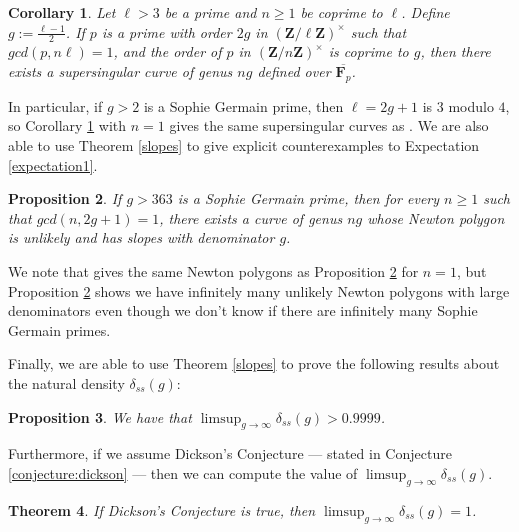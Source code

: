 \documentclass{article}
\newtheorem{theorem}{Theorem}[section]
\newtheorem{corollary}[theorem]{Corollary}
\newtheorem{proposition}[theorem]{Proposition}
\theoremstyle{remark}
\theoremstyle{definition}
\begin{document}
\begin{corollary}
\label{germain2}
    Let $\ell > 3$ be a prime and $n \geq 1$ be coprime to $\ell$. Define $g := \frac{\ell-1}{2}$. If $p$ is a prime with order $2g$ in $\left (\mathbf{Z}/\ell\mathbf{Z} \right)^\times$ such that $gcd(p,n\ell) = 1$, and the order of $p$ in $(\mathbf{Z}/n\mathbf{Z})^\times$ is coprime to $g$, then there exists a supersingular curve of genus $ng$ defined over $\overline{\mathbf{F}_p}$.
\end{corollary}

\par In particular, if $g>2$ is a Sophie Germain prime, then $\ell= 2g+1$ is $3$ modulo $4$, so Corollary \ref{germain2} with $n = 1$ gives the same supersingular curves as \cite[Corollary 3.10]{pries_cyclic}. We are also able to use Theorem \ref{slopes} to give explicit counterexamples to Expectation \ref{expectation1}.

\begin{proposition}
\label{denominators}
    If $g > 363$ is a Sophie Germain prime, then for every $n \geq 1$ such that $gcd(n,2g+1)=1$, there exists a curve of genus $ng$ whose Newton polygon is unlikely and has slopes with denominator $g$. 
\end{proposition}

\par We note that \cite[Corollary 3.10]{pries_cyclic} gives the same Newton polygons as Proposition \ref{denominators} for $n=1$, but Proposition \ref{denominators} shows we have infinitely many unlikely Newton polygons with large denominators even though we don't know if there are infinitely many Sophie Germain primes.

\par Finally, we are able to use Theorem \ref{slopes} to prove the following results about the natural density $\delta_{ss}(g)$:
\begin{proposition} \label{limsup}
    We have that $\limsup_{g \to \infty} \delta_{ss}(g) > 0.9999$.
\end{proposition}

Furthermore, if we assume Dickson's Conjecture --- stated in Conjecture \ref{conjecture:dickson} --- then we can compute the value of $\limsup_{g \to \infty} \delta_{ss}(g)$. 

\begin{theorem}
\label{dickson}
    If Dickson's Conjecture is true, then $\limsup_{g \to \infty} \delta_{ss}(g) = 1$.
\end{theorem}
\end{document}
